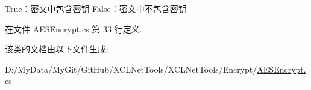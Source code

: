 True：密文中包含密钥 False：密文中不包含密钥 



在文件 A\-E\-S\-Encrypt.\-cs 第 33 行定义.



该类的文档由以下文件生成\-:\begin{DoxyCompactItemize}
\item 
D\-:/\-My\-Data/\-My\-Git/\-Git\-Hub/\-X\-C\-L\-Net\-Tools/\-X\-C\-L\-Net\-Tools/\-Encrypt/\hyperlink{_a_e_s_encrypt_8cs}{A\-E\-S\-Encrypt.\-cs}\end{DoxyCompactItemize}
